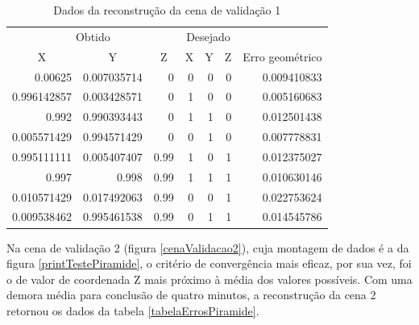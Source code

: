 		\begin{table}
			\caption{Dados da reconstrução da cena de validação 1}
			\label{tabelaErrosCubo}
			\begin{center}
				\begin{tabular}{r r r | r r r | r}
					\hline
					\multicolumn{3}{c}{Obtido} & \multicolumn{3}{c}{Desejado}\\
					\cline{1-6}
					\multicolumn{1}{c}{X} & \multicolumn{1}{c}{Y} & \multicolumn{1}{c}{Z} & \multicolumn{1}{c}{X} & \multicolumn{1}{c}{Y} & \multicolumn{1}{c}{Z} & \multicolumn{1}{c}{Erro geométrico}\\
					\hline			
					0.00625				&			0.007035714		&		0				&		0		&		0		&		0		&		0.009410833\\
					0.996142857		&			0.003428571		&		0				&		1		&		0		&		0		&		0.005160683\\
					0.992					&			0.990393443		&		0				&		1		&		1		&		0		&		0.012501438\\
					0.005571429		& 		0.994571429		&		0				&		0		&		1		&		0		&		0.007778831\\
					0.995111111		&			0.005407407		&		0.99		&		1		&		0		&		1		&		0.012375027\\
					0.997					&			0.998					&		0.99		&		1		&		1		&		1		&		0.010630146\\
					0.010571429		&			0.017492063		&		0.99		&		0		&		0		&		1		&		0.022753624\\
					0.009538462		&			0.995461538		&		0.99		&		0		&		1		&		1		&		0.014545786\\
					\hline
				\end{tabular}
			\end{center}
		\end{table}
		
		Na cena de validação 2 (figura \ref{cenaValidacao2}), cuja montagem de dados é a da figura \ref{printTestePiramide}, o critério de convergência mais eficaz, por sua vez, foi o de valor de coordenada Z mais próximo à média dos valores possíveis. Com uma demora média para conclusão de quatro minutos, a reconstrução da cena 2 retornou os dados da tabela \ref{tabelaErrosPiramide}.
		

